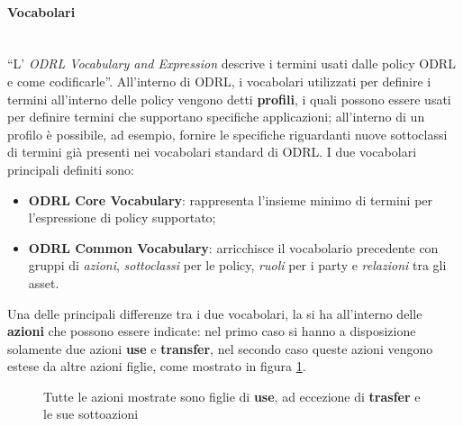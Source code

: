 \documentclass[12pt,a4paper,twoside]{book}
\begin{document}
\paragraph{Vocabolari}\mbox{}\\
\label{profili}
``L' \textit{ODRL Vocabulary and Expression} descrive i termini usati dalle policy ODRL e come codificarle''\cite{ODRVocab}. All'interno di ODRL, i vocabolari utilizzati per definire i termini all'interno delle policy vengono detti \textbf{profili}, i quali possono essere usati per definire termini che supportano specifiche applicazioni; all'interno di un profilo è possibile, ad esempio, fornire le specifiche riguardanti nuove sottoclassi di termini già presenti nei vocabolari standard di ODRL. I due vocabolari principali definiti sono:
\begin{itemize}
	\item \textbf{ODRL Core Vocabulary}: rappresenta l'insieme minimo di termini per l'espressione di policy supportato;
	\item \textbf{ODRL Common Vocabulary}: arricchisce il vocabolario precedente con gruppi di \textit{azioni}, \textit{sottoclassi} per le policy, \textit{ruoli} per i party e \textit{relazioni} tra gli asset.
\end{itemize}
Una delle principali differenze tra i due vocabolari, la si ha all'interno delle \textbf{azioni} che possono essere indicate: nel primo caso si hanno a disposizione solamente due azioni \textbf{use} e \textbf{transfer}, nel secondo caso queste azioni vengono estese da altre azioni figlie, come mostrato in figura \ref{imgUseTransfer}.

\begin{figure}[H]
	\centering
	\def\svgwidth{\columnwidth}
	
	\caption{Tutte le azioni mostrate sono figlie di \textbf{use}, ad eccezione di \textbf{trasfer} e le sue sottoazioni\cite{ODRLBestPract}\label{imgUseTransfer}}
\end{figure}
\end{document}
